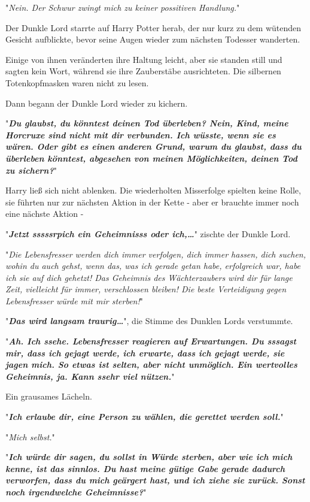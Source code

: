 {"\emph{Nein. Der Schwur zwingt mich zu keiner possitiven Handlung.}"

Der Dunkle Lord starrte auf Harry Potter herab, der nur kurz zu dem wütenden Gesicht aufblickte, bevor seine Augen wieder zum nächsten Todesser wanderten.

Einige von ihnen veränderten ihre Haltung leicht, aber sie standen still und sagten kein Wort, während sie ihre Zauberstäbe ausrichteten. Die silbernen Totenkopfmasken waren nicht zu lesen.

Dann begann der Dunkle Lord wieder zu kichern.

"\textbf{\emph{Du glaubst, du könntest deinen Tod überleben? Nein, Kind, meine Horcruxe sind nicht mit dir verbunden. Ich wüsste, wenn sie es wären. Oder gibt es einen anderen Grund, warum du glaubst, dass du überleben könntest, abgesehen von meinen Möglichkeiten, deinen Tod zu sichern?}}"

Harry ließ sich nicht ablenken. Die wiederholten Misserfolge spielten keine Rolle, sie führten nur zur nächsten Aktion in der Kette - aber er brauchte immer noch eine nächste Aktion -

"\textbf{\emph{Jetzt sssssrpich ein Geheimnisss oder ich,…}}" zischte der Dunkle Lord.

"\emph{Die Lebensfresser werden dich immer verfolgen, dich immer hassen, dich suchen, wohin du auch gehst, wenn das, was ich gerade getan habe, erfolgreich war, habe ich sie auf dich gehetzt! Das Geheimnis des Wächterzaubers wird dir für lange Zeit, vielleicht für immer, verschlossen bleiben! Die beste Verteidigung gegen Lebensfresser würde mit mir sterben!}"

"\textbf{\emph{Das wird langsam traurig…}}", die Stimme des Dunklen Lords verstummte.

"\textbf{\emph{Ah. Ich ssehe. Lebensfresser reagieren auf Erwartungen. Du sssagst mir, dass ich gejagt werde, ich erwarte, dass ich gejagt werde, sie jagen mich. So etwas ist selten, aber nicht unmöglich. Ein wertvolles Geheimnis, ja. Kann ssehr viel nützen.}}"

Ein grausames Lächeln.

"\textbf{\emph{Ich erlaube dir, eine Person zu wählen, die gerettet werden soll.}}"

"\emph{Mich selbst.}"

"\textbf{\emph{Ich würde dir sagen, du sollst in Würde sterben, aber wie ich mich kenne, ist das sinnlos. Du hast meine gütige Gabe gerade dadurch verworfen, dass du mich geärgert hast, und ich ziehe sie zurück. Sonst noch irgendwelche Geheimnisse?}}"

}
